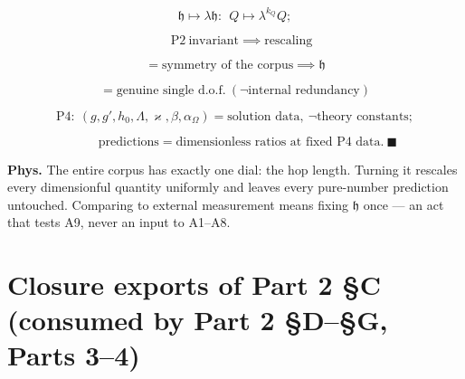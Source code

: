 \begin{theorem}
\[
\mathfrak h\mapsto\lambda\mathfrak h:\ \ Q\mapsto\lambda^{k_Q}Q;
\]

\[
\quad\mathrm{P2}\ \text{invariant}\implies\text{rescaling}
\]

\[
= \text{symmetry of the corpus}\implies\mathfrak h
\]

\[
= \text{genuine single d.o.f.}\ (\neg\text{internal redundancy})
\]

\[
\mathrm{P4}:\ (g,g',h_0,\Lambda,\varkappa,\beta,\alpha_\Omega)=\text{solution data},\ \neg\text{theory constants};
\]

\[
\qquad \text{predictions}=\text{dimensionless ratios at fixed P4 data}.\ \blacksquare
\]

\textbf{Phys.} The entire corpus has exactly one dial: the hop length. Turning it rescales every dimensionful quantity uniformly and leaves every pure-number prediction untouched. Comparing to external measurement means fixing $\mathfrak h$ once — an act that tests A9, never an input to A1–A8.

\end{theorem}

\section[Closure exports of Part 2 §C (consumed by Part 2 §D–§G,…]{\texorpdfstring{Closure exports of Part 2 §C (consumed by Part 2 §D–§G, Parts 3–4)}{Closure exports of Part 2 SC (consumed by Part 2 SD-SG, Parts 3-4)}}

